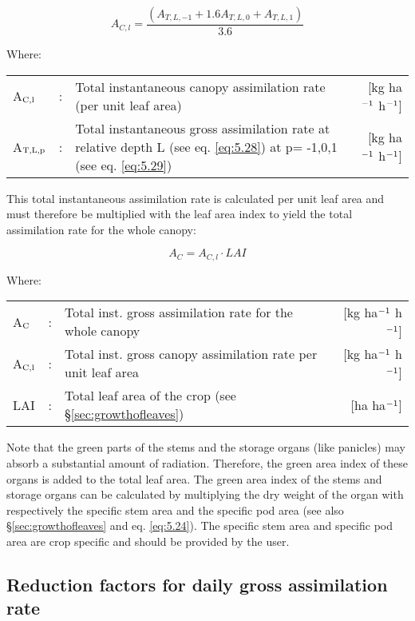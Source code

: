 \begin{equation}
A_{C,l} = {\frac{(A_{T,L,-1} + 1.6 A_{T,L,0} + A_{T,L,1})}{3.6}}
\end{equation}

Where:\\[5pt]
\begin{tabularx}{\textwidth}{llXr}
	A$_{{\rm C,l}}$ &:& Total instantaneous canopy assimilation 
	rate (per unit leaf area)    &    [kg ha$^{{\rm -1}}$ h$^{{\rm -1}}$]\\
	A$_{{\rm T,L,p}}$ &:& Total instantaneous gross assimilation rate at relative 
	depth L (see eq. \ref{eq:5.28}) at p= -1,0,1 (see eq. \ref{eq:5.29})    &    
	[kg ha$^{{\rm -1}}$ h$^{{\rm -1}}$]\\
\end{tabularx}

This total instantaneous assimilation rate is calculated per unit leaf area and must
therefore be multiplied with the leaf area index to yield the total assimilation rate for the
whole canopy:

\begin{equation}
\label{eq:5.31}
A_{C} = A_{C,l} \cdot LAI
\end{equation}

Where:\\[5pt]
\begin{tabularx}{\textwidth}{llXr}
	A$_{{\rm C}}$ &:& Total inst. gross assimilation rate for
	the whole canopy  &  [kg ha$^{{\rm -1}}$ h$^{{\rm -1}}$]\\
	A$_{{\rm C,l}}$ &:& Total inst. gross canopy assimilation rate 
	per unit leaf area &  [kg ha$^{{\rm -1}}$ h$^{{\rm -1}}$]\\
	LAI &:& Total leaf area of the crop (see \S \ref{sec:growthofleaves})  & [ha ha$^{{\rm -1}}$]\\
\end{tabularx}

Note that the green parts of the stems and the storage organs (like panicles) may absorb a
substantial amount of radiation. Therefore, the green area index of these organs is added
to the total leaf area. The green area index of the stems and storage organs can be
calculated by multiplying the dry weight of the organ with respectively the specific stem
area and the specific pod area (see also \S \ref{sec:growthofleaves} and eq. \ref{eq:5.24}). The specific 
stem area and specific pod area are crop specific and should be provided by the user.


\subsection{Reduction factors for daily gross assimilation rate}
\label{sec:DailyGrossPhotosynthesis}

